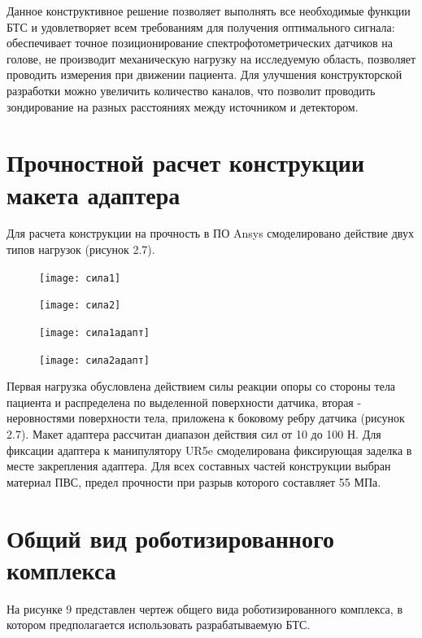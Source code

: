 Данное конструктивное решение позволяет выполнять все необходимые функции БТС и удовлетворяет всем требованиям для получения оптимального сигнала: обеспечивает точное позиционирование  спектрофотометрических датчиков на голове, не производит механическую нагрузку на исследуемую область, позволяет проводить измерения при движении пациента. Для улучшения конструкторской разработки можно увеличить количество каналов, что позволит проводить зондирование на разных расстояниях между источником и детектором.

\section{Прочностной расчет конструкции макета адаптера}
Для расчета конструкции на прочность в ПО Ansys смоделировано действие двух типов нагрузок (рисунок 2.7).
\begin{figure}[!h]
\begin{center}

\begin{minipage}[h]{0.45\linewidth}
\texttt{[image: сила1]}
\end{minipage}
\begin{minipage}[h]{0.45\linewidth}
\texttt{[image: сила2]}
\end{minipage}
\begin{minipage}[!h]{0.45\linewidth}
\texttt{[image: сила1адапт]}
\end{minipage}
\begin{minipage}[h]{0.45\linewidth}
\texttt{[image: сила2адапт]}
\end{minipage}
\caption{\centering {}}
\label{risB}
\end{center}
\end{figure}

Первая нагрузка обусловлена действием силы реакции опоры со стороны тела пациента и распределена по выделенной поверхности датчика, вторая - неровностями поверхности тела, приложена к боковому ребру датчика (рисунок 2.7). Макет адаптера рассчитан диапазон действия сил от 10 до 100 Н. Для фиксации адаптера к манипулятору UR5e смоделирована фиксирующая заделка в месте закрепления адаптера. Для всех составных частей конструкции выбран материал ПВС, предел прочности при разрыв которого составляет 55 МПа. 

\section{Общий вид роботизированного комплекса}
На рисунке 9 представлен чертеж общего вида роботизированного комплекса, в котором предполагается использовать разрабатываемую БТС.

